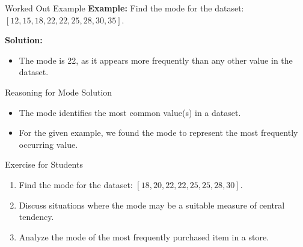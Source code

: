 \begin{frame}{Worked Out Example}
  \textbf{Example:} Find the mode for the dataset: \([12, 15, 18, 22, 22, 25, 28, 30, 35]\).

  \textbf{Solution:}
  \begin{itemize}
    \item The mode is 22, as it appears more frequently than any other value in the dataset.
  \end{itemize}
\end{frame}

\begin{frame}{Reasoning for Mode Solution}
  \begin{itemize}
    \item The mode identifies the most common value(s) in a dataset.
    \item For the given example, we found the mode to represent the most frequently occurring value.
  \end{itemize}
\end{frame}

\begin{frame}{Exercise for Students}
  \begin{enumerate}
    \item Find the mode for the dataset: \([18, 20, 22, 22, 25, 25, 28, 30]\).
    \item Discuss situations where the mode may be a suitable measure of central tendency.
    \item Analyze the mode of the most frequently purchased item in a store.
  \end{enumerate}
\end{frame}
